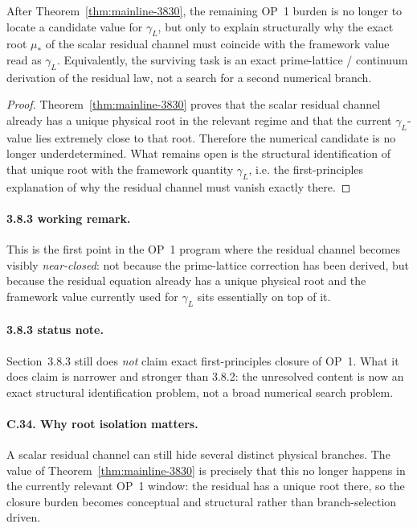 \begin{corollary}
\label{cor:mainline-3830}
After Theorem~\ref{thm:mainline-3830}, the remaining OP~1 burden is no longer to locate a candidate value for \(\gamma_L\), but only to explain structurally why the exact root \(\mu_\ast\) of the scalar residual channel must coincide with the framework value read as \(\gamma_L\). Equivalently, the surviving task is an exact prime-lattice / continuum derivation of the residual law, not a search for a second numerical branch.
\end{corollary}

\begin{proof}
Theorem~\ref{thm:mainline-3830} proves that the scalar residual channel already has a unique physical root in the relevant regime and that the current \(\gamma_L\)-value lies extremely close to that root. Therefore the numerical candidate is no longer underdetermined. What remains open is the structural identification of that unique root with the framework quantity \(\gamma_L\), i.e. the first-principles explanation of why the residual channel must vanish exactly there.
\end{proof}

\paragraph{3.8.3 working remark.}
This is the first point in the OP~1 program where the residual channel becomes visibly \emph{near-closed}: not because the prime-lattice correction has been derived, but because the residual equation already has a unique physical root and the framework value currently used for \(\gamma_L\) sits essentially on top of it.

\paragraph{3.8.3 status note.}
Section~3.8.3 still does \emph{not} claim exact first-principles closure of OP~1. What it does claim is narrower and stronger than 3.8.2: the unresolved content is now an exact structural identification problem, not a broad numerical search problem.

\paragraph{C.34. Why root isolation matters.}
A scalar residual channel can still hide several distinct physical branches. The value of Theorem~\ref{thm:mainline-3830} is precisely that this no longer happens in the currently relevant OP~1 window: the residual has a unique root there, so the closure burden becomes conceptual and structural rather than branch-selection driven.

